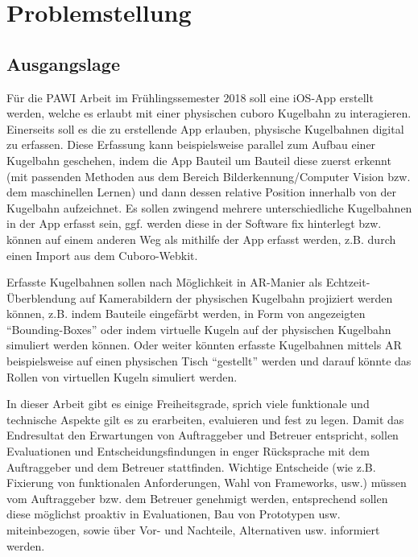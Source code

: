 \section{Problemstellung}

\subsection{Ausgangslage}
Für die PAWI Arbeit im Frühlingssemester 2018 soll eine iOS-App erstellt werden, welche es erlaubt mit einer physischen cuboro Kugelbahn zu interagieren. Einerseits soll es die zu erstellende App erlauben, physische Kugelbahnen digital zu erfassen. Diese Erfassung kann beispielsweise parallel zum Aufbau einer Kugelbahn geschehen, indem die App Bauteil um Bauteil diese zuerst erkennt (mit passenden Methoden aus dem Bereich Bilderkennung/Computer Vision bzw. dem maschinellen Lernen) und dann dessen relative Position innerhalb von der Kugelbahn aufzeichnet. Es sollen zwingend mehrere unterschiedliche Kugelbahnen in der App erfasst sein, ggf. werden diese in der Software fix hinterlegt bzw. können auf einem anderen Weg als mithilfe der App erfasst werden, z.B. durch einen Import aus dem Cuboro-Webkit.

Erfasste Kugelbahnen sollen nach Möglichkeit in AR-Manier als Echtzeit-Überblendung auf Kamerabildern der physischen Kugelbahn projiziert werden können, z.B. indem Bauteile eingefärbt werden, in Form von angezeigten "`Bounding-Boxes"' oder indem virtuelle Kugeln auf der physischen Kugelbahn simuliert werden können. Oder weiter könnten erfasste Kugelbahnen mittels AR beispielsweise auf einen physischen Tisch "`gestellt"' werden und darauf könnte das Rollen von virtuellen Kugeln simuliert werden. 

In dieser Arbeit gibt es einige Freiheitsgrade, sprich viele funktionale und technische Aspekte gilt es zu erarbeiten, evaluieren und fest zu legen. Damit das Endresultat den Erwartungen von Auftraggeber und Betreuer entspricht, sollen Evaluationen und Entscheidungsfindungen in enger Rücksprache mit dem Auftraggeber und dem Betreuer stattfinden. Wichtige Entscheide (wie z.B. Fixierung von funktionalen Anforderungen, Wahl von Frameworks, usw.) müssen vom Auftraggeber bzw. dem Betreuer genehmigt werden, entsprechend sollen diese möglichst proaktiv in Evaluationen, Bau von Prototypen usw. miteinbezogen, sowie über Vor- und Nachteile, Alternativen usw. informiert werden.

